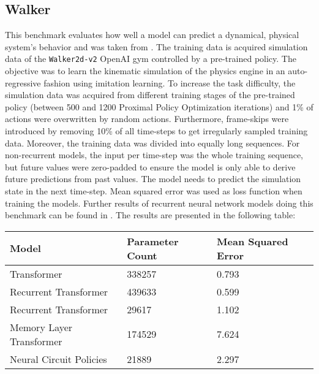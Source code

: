 \documentclass[draft,final]{vutinfth} %
\begin{document}
    \subsection{Walker}
    This benchmark evaluates how well a model can predict a dynamical, physical system's behavior and was taken from \cite{LongTermDependenciesIrregularTimeSeries}.
    The training data is acquired simulation data of the \texttt{Walker2d-v2} OpenAI gym \cite{OpenAIGym} controlled by a pre-trained policy.
    The objective was to learn the kinematic simulation of the physics engine in an auto-regressive fashion using imitation learning.
    To increase the task difficulty, the simulation data was acquired from different training stages of the pre-trained policy (between 500 and 1200 Proximal Policy Optimization iterations) and 1\% of actions were overwritten by random actions.
    Furthermore, frame-skips were introduced by removing 10\% of all time-steps to get irregularly sampled training data.
    Moreover, the training data was divided into equally long sequences.
    For non-recurrent models, the input per time-step was the whole training sequence, but future values were zero-padded to ensure the model is only able to derive future predictions from past values.
    The model needs to predict the simulation state in the next time-step.
    Mean squared error was used as loss function when training the models.
    Further results of recurrent neural network models doing this benchmark can be found in \cite{LatentODEsIrregularlySampled}.
    The results are presented in the following table:
    \begin{table}[h]
        \begin{tabular}{lll}
            \hline
            Model                    & Parameter Count & Mean Squared Error \\ \hline
            Transformer              & 338257          & 0.793              \\
            Recurrent Transformer    & 439633          & 0.599              \\
            Recurrent Transformer    & 29617           & 1.102              \\
            Memory Layer Transformer & 174529          & 7.624              \\
            Neural Circuit Policies  & 21889           & 2.297              \\
        \end{tabular}
    \end{table}
\end{document}
